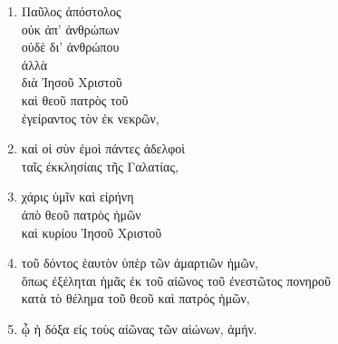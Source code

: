 \documentclass[12pt,a4paper,titlepage]{article}
\newlength{\indentunit}
\newlength{\curindent}
\newcommand{\indentlvl}[1]{\setlength{\curindent}{#1\indentunit}\hspace*{\curindent}}
\newcommand{\brk}{\\
\hspace*{\curindent}} %
\def \pscolor{red} %
\def \pslabelsep{0.3em} %
\def \psleftmargin{1.5em} %
\begin{document}
\begin{enumerate}[leftmargin=\psleftmargin, labelsep=\pslabelsep, label=\arabic*, align=right, font=\fontspec{Linux Libertine}\color{\pscolor}\small\textsuperscript, parsep=0em, itemsep=0em, topsep=0em]
\subsection*{Adresse, source et contenu de l'Évangile de Paul}
  \item Παῦλος ἀπόστολος \\
        \indentlvl{1}οὐκ ἀπ’ ἀνθρώπων\brk
        οὐδὲ δι’ ἀνθρώπου \brk
        ἀλλὰ \\
        \indentlvl{2}διὰ Ἰησοῦ Χριστοῦ \brk
        καὶ θεοῦ πατρὸς τοῦ \\
        \indentlvl{3}ἐγείραντος τὸν ἐκ νεκρῶν,
  \item καὶ οἱ σὺν ἐμοὶ πάντες ἀδελφοὶ \\
        ταῖς ἐκκλησίαις τῆς Γαλατίας,
  \item χάρις ὑμῖν καὶ εἰρήνη \\
        \indentlvl{1}ἀπὸ θεοῦ πατρὸς ἡμῶν \brk
        καὶ κυρίου Ἰησοῦ Χριστοῦ
  \item \indentlvl{2}τοῦ δόντος ἑαυτὸν ὑπὲρ τῶν ἁμαρτιῶν ἡμῶν,\\
        \indentlvl{3}ὅπως ἐξέληται ἡμᾶς ἐκ τοῦ αἰῶνος τοῦ ἐνεστῶτος πονηροῦ \brk
        κατὰ τὸ θέλημα τοῦ θεοῦ καὶ πατρὸς ἡμῶν,
  \item  \indentlvl{4}ᾧ ἡ δόξα εἰς τοὺς αἰῶνας τῶν αἰώνων, ἀμήν. 
  

\end{enumerate}
\end{document}
